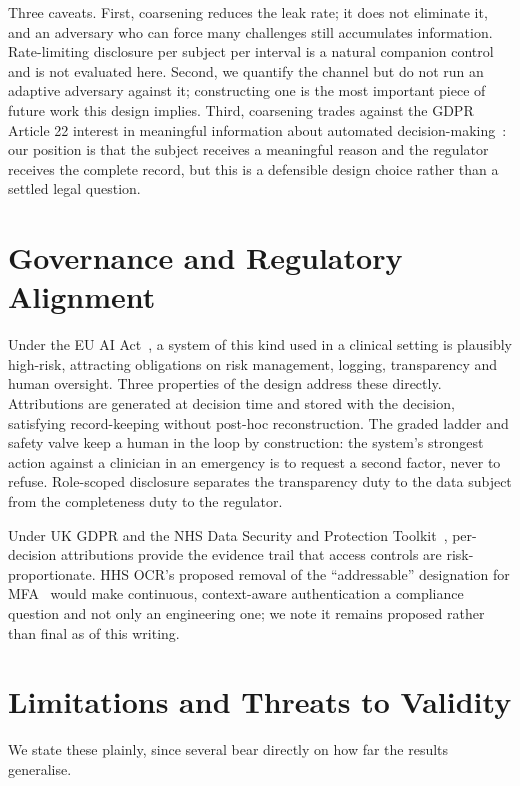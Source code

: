 \documentclass[conference]{IEEEtran}
\begin{document}
Three caveats. First, coarsening reduces the leak rate; it does not eliminate
it, and an adversary who can force many challenges still accumulates
information. Rate-limiting disclosure per subject per interval is a natural
companion control and is not evaluated here. Second, we quantify the channel
but do not run an adaptive adversary against it; constructing one is the most
important piece of future work this design implies. Third, coarsening trades
against the GDPR Article 22 interest in meaningful information about automated
decision-making~\cite{gdpr}: our position is that the subject receives a
meaningful reason and the regulator receives the complete record, but this is a
defensible design choice rather than a settled legal question.

\section{Governance and Regulatory Alignment}

Under the EU AI Act~\cite{euaiact}, a system of this kind used in a clinical
setting is plausibly high-risk, attracting obligations on risk management,
logging, transparency and human oversight. Three properties of the design
address these directly. Attributions are generated at decision time and stored
with the decision, satisfying record-keeping without post-hoc reconstruction.
The graded ladder and safety valve keep a human in the loop by construction:
the system's strongest action against a clinician in an emergency is to request
a second factor, never to refuse. Role-scoped disclosure separates the
transparency duty to the data subject from the completeness duty to the
regulator.

Under UK GDPR and the NHS Data Security and Protection
Toolkit~\cite{nhsdspt}, per-decision attributions provide the evidence trail
that access controls are risk-proportionate. HHS OCR's proposed removal of the
``addressable'' designation for MFA~\cite{hhsnprm} would make continuous,
context-aware authentication a compliance question and not only an engineering
one; we note it remains proposed rather than final as of this writing.

\section{Limitations and Threats to Validity}
\label{sec:limits}

We state these plainly, since several bear directly on how far the results
generalise.
\end{document}
